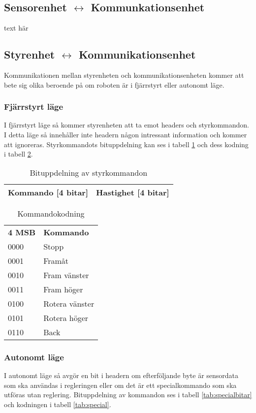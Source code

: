 \subsection{Sensorenhet $\longleftrightarrow$ Kommunkationsenhet}
text här
\subsection{Styrenhet $\longleftrightarrow$ Kommunikationsenhet}
Kommunikationen mellan styrenheten och kommunikationsenheten kommer att bete sig olika beroende på
om roboten är i fjärrstyrt eller autonomt läge.
\subsubsection{Fjärrstyrt läge}
I fjärrstyrt läge så kommer styrenheten att ta emot headers och styrkommandon. I detta läge så 
innehåller inte headern någon intressant information och kommer att ignoreras. Styrkommandots bituppdelning kan ses i 
tabell \ref{tab:styrbitar} och dess kodning i tabell \ref{tab:styrkommando}.
 
\begin{table}[h] 
  \centering
  \begin{tabular}{| c | c |}
    \hline
    Kommando [4 bitar] & Hastighet [4 bitar] \\ \hline
  \end{tabular}
  \caption{Bituppdelning av styrkommandon}
  \label{tab:styrbitar}
\end{table}

\begin{table}[h] 
  \centering
  \begin{tabular}{l l}
    \textbf{4 MSB} & \textbf{Kommando} \\
    0000 & Stopp \\
    0001 & Framåt \\
    0010 & Fram vänster \\
    0011 & Fram höger \\
    0100 & Rotera vänster \\
    0101 & Rotera höger \\
    0110 & Back \\
  \end{tabular}
  \caption{Kommandokodning}
  \label{tab:styrkommando}
\end{table}

\subsubsection{Autonomt läge}
I autonomt läge så avgör en bit i headern om efterföljande byte är sensordata som ska användas i regleringen eller
om det är ett specialkommando som ska utföras utan reglering.
Bituppdelning av kommandon ses i tabell \ref{tab:specialbitar} och kodningen i tabell \ref{tab:special}.

